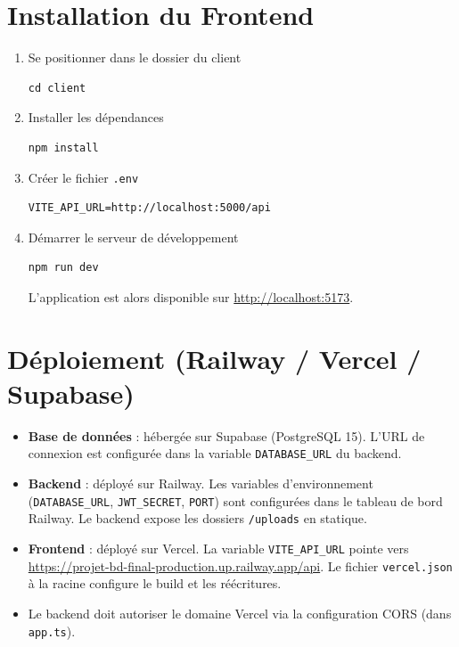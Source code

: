 \documentclass[12pt,a4paper]{report}
\begin{document}
\section{Installation du Frontend}
\begin{enumerate}[leftmargin=*]
    \item Se positionner dans le dossier du client
\begin{lstlisting}
cd client
\end{lstlisting}
 
    \item Installer les dépendances
\begin{lstlisting}
npm install
\end{lstlisting}
 
    \item Créer le fichier \texttt{.env}
\begin{lstlisting}
VITE_API_URL=http://localhost:5000/api
\end{lstlisting}
 
    \item Démarrer le serveur de développement
\begin{lstlisting}
npm run dev
\end{lstlisting}
    L'application est alors disponible sur \url{http://localhost:5173}.
\end{enumerate}
 
\section{Déploiement (Railway / Vercel / Supabase)}
\begin{itemize}[leftmargin=*]
    \item \textbf{Base de données} : hébergée sur Supabase (PostgreSQL 15). L'URL de connexion est configurée dans la variable \texttt{DATABASE\_URL} du backend.
    \item \textbf{Backend} : déployé sur Railway. Les variables d'environnement (\texttt{DATABASE\_URL}, \texttt{JWT\_SECRET}, \texttt{PORT}) sont configurées dans le tableau de bord Railway. Le backend expose les dossiers \texttt{/uploads} en statique.
    \item \textbf{Frontend} : déployé sur Vercel. La variable \texttt{VITE\_API\_URL} pointe vers \url{https://projet-bd-final-production.up.railway.app/api}. Le fichier \texttt{vercel.json} à la racine configure le build et les réécritures.
    \item Le backend doit autoriser le domaine Vercel via la configuration CORS (dans \texttt{app.ts}).
\end{itemize}
 
\end{document}
